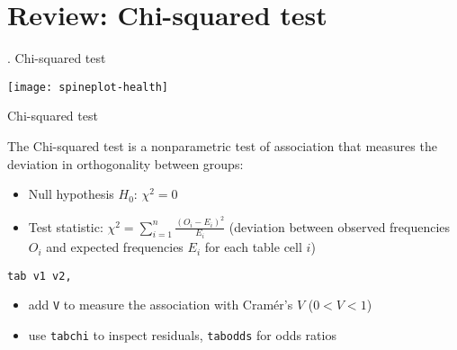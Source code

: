 \documentclass[t]{beamer}
\begin{document}
	
	\section{Review: Chi-squared test}
	
	
	\begin{frame}[c]{\thesection. Chi-squared test}

		\texttt{[image: spineplot-health]}
		
	\end{frame}
	

	

	\begin{frame}{Chi-squared test}
		
		\begin{block}{The Chi-squared test is a nonparametric test of association that measures the deviation in orthogonality between groups:}
		
			\begin{itemize}
				\item Null hypothesis $H_0$:
				$\chi^2=0$
			
				\item Test statistic:
				$\chi^2=\sum_{i=1}^{n} \frac{(O_i - E_i)^2}{E_i}$ (deviation between observed frequencies $O_i$ and expected frequencies $E_i$ for each table cell $i$)
				
			\end{itemize}

		\end{block}
		
		\begin{block}{\texttt{tab v1 v2, }}

			\begin{itemize}
				\item add \texttt{V} to measure the association with Cramér's $V$ ($0 < V < 1$)
				\item use \texttt{tabchi} to inspect residuals, \texttt{tabodds} for odds ratios
			\end{itemize}

		\end{block}
		
	\end{frame}
	
\end{document}
